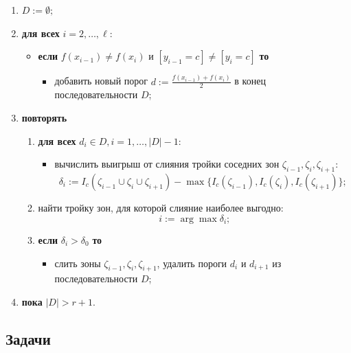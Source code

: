 \begin{enumerate}
    \item $D := \emptyset;$
    \item \textbf{для всех} $i = 2, \dots, \ell$:
          \begin{itemize}
              \item \textbf{если} $f(x_{i-1}) \neq f(x_i)$ и $[y_{i-1} = c] \neq [y_i = c]$ \textbf{то}
                    \begin{itemize}
                        \item добавить новый порог $d := \frac{f(x_{i-1}) + f(x_i)}{2}$ в конец последовательности $D$;
                    \end{itemize}
          \end{itemize}
    \item \textbf{повторять}
          \begin{enumerate}
              \item \textbf{для всех} $d_i \in D, i = 1, \dots, |D| - 1$:
                    \begin{itemize}
                        \item вычислить выигрыш от слияния тройки соседних зон $\zeta_{i-1}, \zeta_i, \zeta_{i+1}$:
                              \[
                                  \delta_i := I_c(\zeta_{i-1} \cup \zeta_i \cup \zeta_{i+1}) - \max\{I_c(\zeta_{i-1}), I_c(\zeta_i), I_c(\zeta_{i+1})\};
                              \]
                    \end{itemize}
              \item найти тройку зон, для которой слияние наиболее выгодно:
                    \[
                        i := \arg \max \delta_i;
                    \]
              \item \textbf{если} $\delta_i > \delta_0$ \textbf{то}
                    \begin{itemize}
                        \item слить зоны $\zeta_{i-1}, \zeta_i, \zeta_{i+1}$, удалить пороги $d_i$ и $d_{i+1}$ из последовательности $D$;
                    \end{itemize}
          \end{enumerate}
    \item \textbf{пока} $|D| > r + 1$.
\end{enumerate}

\subsection{Задачи}

